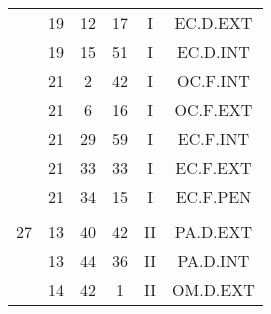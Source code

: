 \documentclass[12pt, a4paper]{article}
\begin{document}
\begin{multicols}{3}
{\begin{tabular}{c c c c c c}
	 	 	 	 & 19 & 12 & 17 & I & EC.D.EXT\\%
	 	 	 	 & 19 & 15 & 51 & I & EC.D.INT\\%
	 	 	 	 & 21 & 2 & 42 & I & OC.F.INT\\%
	 	 	 	 & 21 & 6 & 16 & I & OC.F.EXT\\%
	 	 	 	 & 21 & 29 & 59 & I & EC.F.INT\\%
	 	 	 	 & 21 & 33 & 33 & I & EC.F.EXT\\%
	 	 	 	 & 21 & 34 & 15 & I & EC.F.PEN\\%
	 	 	 	 & & & & & \\%
	 	 	 	27 & 13 & 40 & 42 & II & PA.D.EXT\\%
	 	 	 	 & 13 & 44 & 36 & II & PA.D.INT\\%
	 	 	 	 & 14 & 42 & 1 & II & OM.D.EXT\\%
	 	 \end{tabular}
 	}
\end{multicols}
\end{document}
